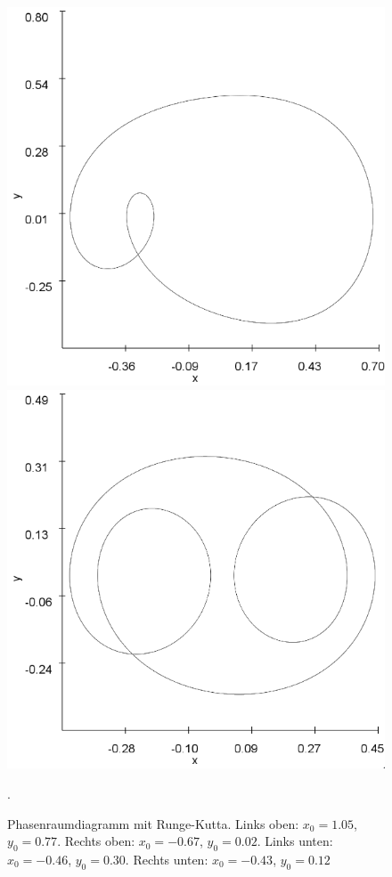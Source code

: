 \documentclass{scrartcl}
\begin{document}
\begin{figure}
\includegraphics[scale=0.4]{duffing-awp4-500k-nach-500k-h0,01-runge}
\includegraphics[scale=0.4]{duffing-awp5-500k-nach-500k-h0,01-runge}
\caption{Phasenraumdiagramm mit Runge-Kutta. Links oben: $x_0=1.05$, $y_0=0.77$. Rechts oben: $x_0=-0.67$, $y_0=0.02$. Links unten: $x_0=-0.46$, $y_0=0.30$. Rechts unten: $x_0=-0.43$, $y_0=0.12$}. 
\label{fig:duffing-allawp}
\end{figure}
\end{document}
